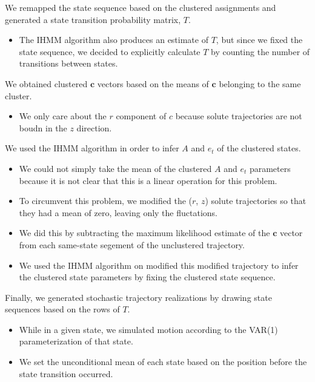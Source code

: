 \documentclass{article}
\begin{document}
  We remapped the state sequence based on the clustered assignments and
  generated a state transition probability matrix, $T$.
  \begin{itemize}
   \item The IHMM algorithm also produces an estimate of $T$, but since we 
   fixed the state sequence, we decided to explicitly calculate $T$ by 
   counting the number of transitions between states.
  \end{itemize}  
  
  We obtained clustered $\mathbf{c}$ vectors based on the means of 
  $\mathbf{c}$ belonging to the same cluster.
  \begin{itemize}
   \item We only care about the $r$ component of $c$ because solute
   trajectories are not boudn in the $z$ direction.
  \end{itemize}
  
  We used the IHMM algorithm in order to infer $A$ and $e_t$ of the 
  clustered states.
  \begin{itemize}
   \item We could not simply take the mean of the clustered 
   $A$ and $e_t$ parameters because it is not clear that this is a linear 
   operation for this problem. 
   \item To circumvent this problem, we modified the ($r$, $z$) solute
   trajectories so that they had a mean of zero, leaving only the 
   fluctations. 
   \item We did this by subtracting the maximum likelihood estimate
   of the $\mathbf{c}$ vector from each same-state segement of the unclustered
   trajectory.   
   \item We used the IHMM algorithm on modified this modified trajectory to infer
   the clustered state parameters by fixing the clustered state sequence. 
  \end{itemize}
  
  Finally, we generated stochastic trajectory realizations by drawing state sequences 
  based on the rows of $T$.
  \begin{itemize}
    \item While in a given state, we simulated motion according to the VAR(1)
    parameterization of that state.
    \item We set the unconditional mean of each state based on the position 
    before the state transition occurred.
  \end{itemize} 
  
\end{document}
